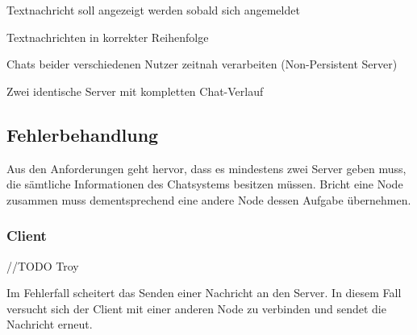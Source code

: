 Textnachricht soll angezeigt werden sobald sich angemeldet

Textnachrichten in korrekter Reihenfolge

Chats beider verschiedenen Nutzer zeitnah verarbeiten (Non-Persistent Server)

Zwei identische Server mit kompletten Chat-Verlauf

\subsection{Fehlerbehandlung}
Aus den Anforderungen geht hervor, dass es mindestens zwei Server geben muss, die sämtliche Informationen des Chatsystems besitzen müssen. Bricht eine Node zusammen muss dementsprechend eine andere Node dessen Aufgabe übernehmen.
\subsubsection{Client}
//TODO Troy

Im Fehlerfall scheitert das Senden einer Nachricht an den Server. In diesem Fall versucht sich der Client mit einer anderen Node zu verbinden und sendet die Nachricht erneut.

